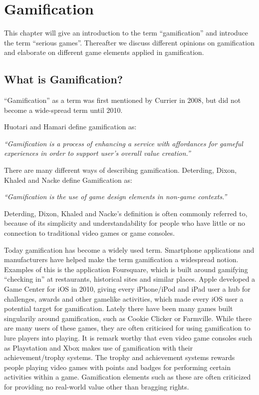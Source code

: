 \chapter{Gamification}
\label{chp:gamification}

This chapter will give an introduction to the term ``gamification'' and introduce the term ``serious games''. Thereafter we discuss different opinions on gamification and elaborate on different game elements applied in gamification.

\section{What is Gamification?}
\label{sec:whatisgamification}
``Gamification'' as a term was first mentioned by Currier in 2008\cite{gamificationcurrier}, but did not become a wide-spread term until 2010. 

Huotari and Hamari define gamification as:

\textit{``Gamification is a process of enhancing a service with affordances for gameful experiences in order to support user's overall value creation.''}\cite{huotari2012defining}

There are many different ways of describing gamification. Deterding, Dixon, Khaled and Nacke define Gamification as:

\textit{``Gamification is the use of game design elements in non-game
contexts.''}\cite{Deterding:2011:GDE:2181037.2181040}

Deterding, Dixon, Khaled and Nacke's definition is often commonly referred to, because of its simplicity and understandability for people who have little or no connection to traditional video games or game consoles.

Today gamification has become a widely used term. Smartphone applications and manufacturers have helped make the term gamification a widespread notion. Examples of this is the application Foursquare, which is built around gamifying ``checking in'' at restaurants, historical sites and similar places. Apple developed a Game Center for iOS in 2010, giving every iPhone/iPod and iPad user a hub for challenges, awards and other gamelike activities, which made every iOS user a potential target for gamification. Lately there have been many games built singularily around gamification, such as Cookie Clicker or Farmville. While there are many users of these games, they are often criticised for using gamification to lure players into playing. It is remark worthy that even video game consoles such as Playstation and Xbox makes use of gamification with their achievement/trophy systems. The trophy and achievement systems rewards people playing video games with points and badges for performing certain activities within a game. Gamification elements such as these are often criticized for providing no real-world value other than bragging rights.


